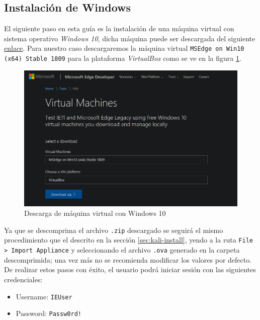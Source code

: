 \documentclass{article}
\begin{document}
        \subsection{Instalación de Windows}

            El siguiente paso en esta guía es la instalación de una máquina virtual con sistema operativo \emph{Windows 10}, dicha máquina puede ser descargada del siguiente \href{https://developer.microsoft.com/en-us/microsoft-edge/tools/vms/}{enlace}. Para nuestro caso descargaremos la máquina virtual \texttt{MSEdge on Win10 (x64) Stable 1809} para la plataforma \emph{VirtualBox} como se ve en la figura \ref{fig:windows-download}.
            \begin{figure}[!htbp]
                \centering
                \includegraphics[scale=0.3]{img/win-download.png}
                \caption{Descarga de máquina virtual con Windows 10}
                \label{fig:windows-download}
            \end{figure}

            Ya que se descomprima el archivo \texttt{.zip} descargado se seguirá el mismo procedimiento que el descrito en la sección \ref{sec:kali-install}, yendo a la ruta \texttt{File > Import Appliance} y seleccionando el archivo \texttt{.ova} generado en la carpeta descomprimida; una vez más no se recomienda modificar los valores por defecto. De realizar estos pasos con éxito, el usuario podrá iniciar sesión con las siguientes credenciales:
            \begin{itemize}
                \item Username: \texttt{IEUser}
                \item Password: \texttt{Passw0rd!}
            \end{itemize}
\end{document}
